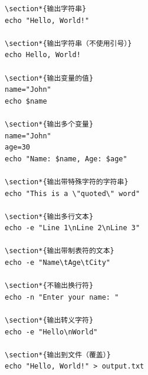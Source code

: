 \documentclass[12pt,UTF8]{ctexbook}
\begin{document}
\begin{verbatim}
\section*{输出字符串}
echo "Hello, World!"

\section*{输出字符串（不使用引号）}
echo Hello, World!

\section*{输出变量的值}
name="John"
echo $name

\section*{输出多个变量}
name="John"
age=30
echo "Name: $name, Age: $age"

\section*{输出带特殊字符的字符串}
echo "This is a \"quoted\" word"

\section*{输出多行文本}
echo -e "Line 1\nLine 2\nLine 3"

\section*{输出带制表符的文本}
echo -e "Name\tAge\tCity"

\section*{不输出换行符}
echo -n "Enter your name: "

\section*{输出转义字符}
echo -e "Hello\nWorld"

\section*{输出到文件（覆盖）}
echo "Hello, World!" > output.txt


\end{verbatim}
\end{document}
